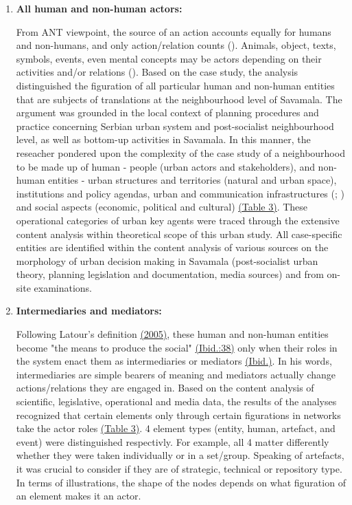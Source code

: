 \documentclass[11pt]{report}
\begin{document}
\begin{enumerate}
\item \textbf{All human and non-human actors:}

From ANT viewpoint, the source of an action accounts equally for humans and non-humans, and only action/relation counts (\cite{Latour 1996}). Animals, object, texts, symbols, events, even mental concepts may be actors depending on their activities and/or relations (\cite{Cerulo 2009}).
Based on the case study, the analysis distinguished the figuration of all particular human and non-human entities that are subjects of translations at the neighbourhood level of Savamala. The argument was grounded in the local context of planning procedures and practice concerning Serbian urban system and post-socialist neighbourhood level, as well as bottom-up activities in Savamala. In this manner, the reseacher pondered upon the complexity of the case study of a neighbourhood to be made up of human - people (urban actors and stakeholders), and non-human entities - urban structures and territories (natural and urban space), institutions and policy agendas, urban and communication infrastructures (\cite{Mitchell 1999}; \cite{Firmino et al., 2008}) and social aspects (economic, political and cultural) \href{}{(Table 3)}. These operational categories of urban key agents were traced through the extensive content analysis within theoretical scope of this urban study. All case-specific entities are identified within the content analysis of various sources on the morphology of urban decision making in Savamala (post-socialist urban theory, planning legislation and documentation, media sources) and from on-site examinations.

\item \textbf{Intermediaries and mediators:}

Following Latour’s definition \href{}{(2005)}, these human and non-human entities become "the means to produce the social" \href{}{(Ibid.:38)} only when their roles in the system enact them as intermediaries or mediators \href{}{(Ibid.)}. In his words, intermediaries are simple bearers of meaning and mediators actually change actions/relations they are engaged in.
Based on the content analysis of scientific, legislative, operational and media data, the results of the analyses recognized that certain elements only through certain figurations in networks take the actor roles \href{}{(Table 3)}. 4 element types (entity, human, artefact, and event) were distinguished respectivly. For example, all 4 matter differently whether they were taken individually or in a set/group. Speaking of artefacts, it was crucial to consider if they are of strategic, technical or repository type. In terms of illustrations, the shape of the nodes depends on what figuration of an element makes it an actor.


\end{enumerate}
\end{document}
